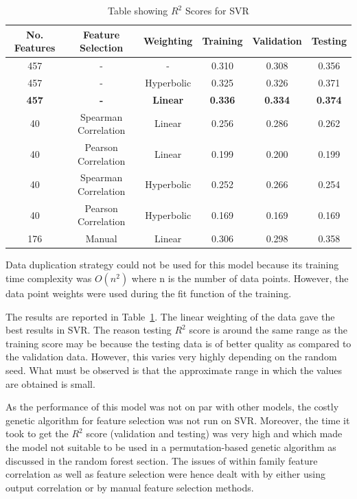 \documentclass[11pt]{article}
\begin{document}
\begin{table} [h!]
\centering
\resizebox{\linewidth}{!} {
 \begin{tabular}{ | c | c | c | c | c | c | }
\hline
\textbf{No. Features} & \textbf{Feature Selection} & \textbf{Weighting} & \textbf{Training} & \textbf{Validation} &  \textbf{Testing} \\ [0.5 ex]
\hline \hline
457 & - & - & 0.310 & 0.308 & 0.356\\
457 & - & Hyperbolic & 0.325 & 0.326 & 0.371\\
\textbf{457} & \textbf{-} & \textbf{Linear}  & \textbf{0.336} &\textbf{0.334} & \textbf{0.374}\\
40 & Spearman Correlation & Linear & 0.256 & 0.286  & 0.262 \\ 
40 & Pearson Correlation & Linear & 0.199 & 0.200 & 0.199 \\ 
40 & Spearman Correlation & Hyperbolic & 0.252 & 0.266 & 0.254 \\ 
40 & Pearson Correlation & Hyperbolic & 0.169 & 0.169 & 0.169 \\ 
176 & Manual & Linear &  0.306  & 0.298  & 0.358\\ [1ex]
\hline
\end{tabular}
}
\caption{Table showing  $R^2$ Scores for SVR}
\label {table:2}
\end{table}

Data duplication strategy could not be used for this model because its training time complexity was $O(n^2)$ where n is the number of data points. However, the data point weights were used during the fit function of the training.

The results are reported in Table~\ref{table:2}.
The linear weighting of the data gave the best results in SVR.
The reason testing $R^2$ score is around the same range as the training score may be because the testing data is of better quality as compared to the validation data.
However, this varies very highly depending on the random seed.
What must be observed is that the approximate range in which the values are obtained is small.

As the performance of this model was not on par with other models,
the costly genetic algorithm for feature selection was not run on SVR.
Moreover,  the time it took to get the $R^2$ score (validation and testing) was very high and which made the model not suitable to be used in a permutation-based genetic algorithm as discussed in the random forest section.
The issues of within family feature correlation as well as feature selection were hence dealt with by either using output correlation or by manual feature selection methods.
\end{document}

